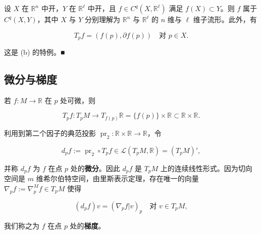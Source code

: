 \begin{example}
\begin{items}
\item

设 $ X $ 在 $ \mathbb{R}^{n} $ 中开，$ Y $ 在 $ \mathbb{R}^{\ell} $ 中开，且 $ f \in C^{q}(X,\mathbb{R}^{\ell}) $ 满足 $ f(X) \subset Y $。则 $ f $ 属于 $ C^{q}(X,Y) $，其中 $ X $ 与 $ Y $ 分别理解为 $ \mathbb{R}^{n} $ 与 $ \mathbb{R}^{\ell} $ 的 $ n $ 维与 $ \ell $ 维子流形。此外，有

\[
T_{p}f = (f(p), \partial f(p)) \quad \text{对 } p \in X .
\]

\proofhead
这是 (b) 的特例。\nobreak\hspace{0.35em}■
\end{items}

\end{example}

\subsection*{微分与梯度}

若 $ f : M \to \mathbb{R} $ 在 $ p $ 处可微，则

\[
T_{p}f : T_{p}M \to T_{f(p)}\mathbb{R} = \{f(p)\}\times\mathbb{R} \subset \mathbb{R}\times\mathbb{R} .
\]

利用到第二个因子的典范投影 $ \operatorname{pr}_{2} : \mathbb{R}\times\mathbb{R} \to \mathbb{R} $，令

\[
d_{p}f := \operatorname{pr}_{2}\circ T_{p}f \in \mathcal{L}(T_{p}M,\mathbb{R}) = (T_{p}M)' ,
\]

并称 $ d_{p}f $ 为 $ f $ 在点 $ p $ 处的\textbf{微分}。因此 $ d_{p}f $ 是 $ T_{p}M $ 上的连续线性形式。因为切向空间是 $ m $ 维希尔伯特空间，由里斯表示定理，存在唯一的向量 $ \nabla_{p}f := \nabla_{p}^{M}f \in T_{p}M $ 使得

\[
(d_{p}f)v = (\nabla_{p}f|v)_{p} \quad \text{对 } v \in T_{p}M ,
\]

我们称之为 $ f $ 在点 $ p $ 处的\textbf{梯度}。

